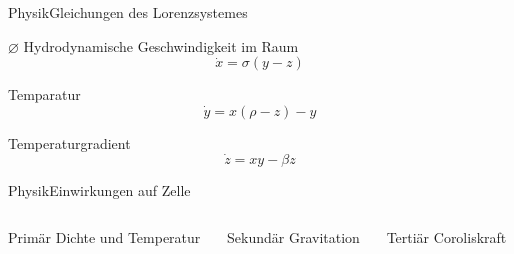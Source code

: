 \documentclass[presentation.tex]{subfiles}
\begin{document}
	\begin{frame}{Physik}{Gleichungen des Lorenzsystemes}
		\begin{block}{$\varnothing$ Hydrodynamische Geschwindigkeit im Raum}
			\begin{equation}
				\dot{x} = \sigma(y - z)
			\end{equation}
		\end{block}
		\begin{block}{Temparatur}
			\begin{equation}
				\dot{y} = x(\rho - z) - y
			\end{equation}
		\end{block}
		\begin{block}{Temperaturgradient}
			\begin{equation}
				\dot{z} = xy - \beta z
			\end{equation}
		\end{block}
	\end{frame}

	\begin{frame}{Physik}{Einwirkungen auf Zelle}
		\begin{columns}[c]
			\begin{column}{.3\textwidth}
				\begin{block}{Primär}
					Dichte und Temperatur
				\end{block}
			\end{column}
			\begin{column}{.3\textwidth}
				\begin{block}{Sekundär}
					Gravitation
				\end{block}
			\end{column}
			\begin{column}{0.3\textwidth}
				\begin{block}{Tertiär}
					Coroliskraft
				\end{block}
			\end{column}
		\end{columns}
	\end{frame}
\end{document}
